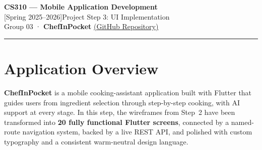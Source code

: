 \documentclass[11pt,a4paper]{article}
\begin{document}
\begin{center}
  {\large\bfseries CS310 — Mobile Application Development}\\[4pt]
  {\large [Spring 2025--2026]\quad Project Step 3: UI Implementation}\\[4pt]
  {\large Group 03 · \textbf{ChefInPocket} \quad
    \href{https://github.com/mesely/ChefInPocket.git}{\textcolor{accent}{(GitHub Repository)}}}
\end{center}

\medskip
\noindent\textcolor{border}{\rule{\linewidth}{0.4pt}}
\medskip

\section{Application Overview}

\textbf{ChefInPocket} is a mobile cooking-assistant application built with Flutter that guides users from ingredient selection through step-by-step cooking, with AI support at every stage. In this step, the wireframes from Step~2 have been transformed into \textbf{20 fully functional Flutter screens}, connected by a named-route navigation system, backed by a live REST API, and polished with custom typography and a consistent warm-neutral design language.
\end{document}
